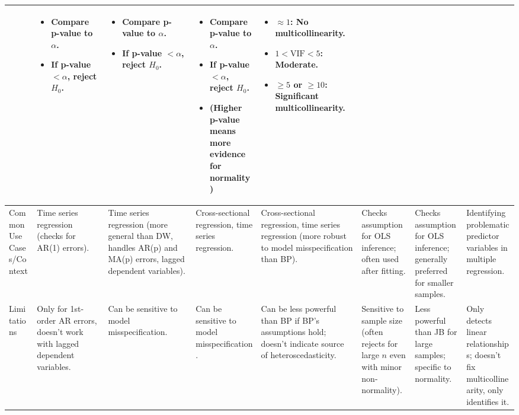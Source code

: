 \documentclass[10pt]{article}
\begin{document}
\begin{longtable}{|L{3.8cm}|L{3.0cm}|L{3.0cm}|L{3.0cm}|L{3.0cm}|L{3.0cm}|L{3.0cm}|L{3.0cm}|}
\begin{itemize}[nosep, leftmargin=*, topsep=0pt, partopsep=0pt]
		\end{itemize} &
		\begin{itemize}[nosep, leftmargin=*, topsep=0pt, partopsep=0pt]
				\item Compare p-value to $\alpha$.
				\item If p-value $<\alpha$, reject $H_0$.
		\end{itemize} &
		\begin{itemize}[nosep, leftmargin=*, topsep=0pt, partopsep=0pt]
				\item Compare p-value to $\alpha$.
				\item If p-value $<\alpha$, reject $H_0$.
		\end{itemize} &
		\begin{itemize}[nosep, leftmargin=*, topsep=0pt, partopsep=0pt]
				\item Compare p-value to $\alpha$.
				\item If p-value $<\alpha$, reject $H_0$.
				\item (Higher p-value means more evidence for normality)
		\end{itemize} &
		\begin{itemize}[nosep, leftmargin=*, topsep=0pt, partopsep=0pt]
				\item $\approx 1$: No multicollinearity.
				\item $1 < \text{VIF} < 5$: Moderate.
				\item $\ge 5$ or $\ge 10$: Significant multicollinearity.
		\end{itemize} \\
		\hline
		Common Use Cases/Context & Time series regression (checks for AR(1) errors). & Time
		series regression (more general than DW, handles AR(p) and MA(p) errors, lagged
		dependent variables). & Cross-sectional regression, time series regression. &
		Cross-sectional regression, time series regression (more robust to model
		misspecification than BP). & Checks assumption for OLS inference; often used after
		fitting. & Checks assumption for OLS inference; generally preferred for smaller
		samples. & Identifying problematic predictor variables in multiple regression. \\
		\hline
		Limitations & Only for 1st-order AR errors, doesn't work with lagged dependent
		variables. & Can be sensitive to model misspecification. & Can be sensitive to model
		misspecification. & Can be less powerful than BP if BP's assumptions hold; doesn't
		indicate source of heteroscedasticity. & Sensitive to sample size (often rejects for
		large $n$ even with minor non-normality). & Less powerful than JB for large samples;
		specific to normality. & Only detects linear relationships; doesn't fix
		multicollinearity, only identifies it. \\
		\hline
\end{longtable}
\end{document}
